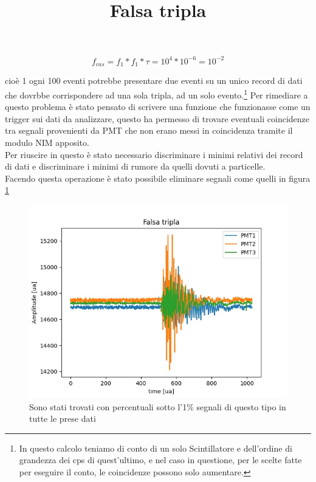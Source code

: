 \documentclass[a4paper]{article}
\begin{document}
\begin{equation}
f_{cas} = f_1*f_1*\tau = 10^4*10^{-6} = 10^{-2}
\end{equation}

cioè 1 ogni 100 eventi potrebbe presentare due eventi su un unico record di dati che dovrbbe corrispondere ad una sola tripla, ad un solo evento.\footnote{In questo calcolo teniamo di conto di un solo Scintillatore e dell'ordine di grandezza dei cps di quest'ultimo, e nel caso in questione, per le scelte fatte per eseguire il conto, le coincidenze possono solo aumentare.}
Per rimediare a questo problema è stato pensato di scrivere una funzione che funzionasse come un trigger sui dati da analizzare, questo ha permesso di trovare eventuali coincidenze tra segnali provenienti da PMT che non erano messi in coincidenza tramite il modulo NIM apposito.\\
Per riuscire in questo è stato necessario discriminare i minimi relativi dei record di dati e discriminare i minimi di rumore da quelli dovuti a particelle.\\
Facendo questa operazione è stato possibile eliminare segnali come quelli in figura \ref{fig:FalsaTripla}

\begin{figure}[H]
\centering
\title{Falsa tripla}
\begin{center}
\includegraphics[scale=0.4]{./immagini/TimeOfFlight/FalsaTripla.jpg}
\caption{Sono stati trovati con percentuali sotto l'1$\%$ segnali di questo tipo in tutte le prese dati}
\label{fig:FalsaTripla}
\end{center}
\end{figure}
\end{document}
